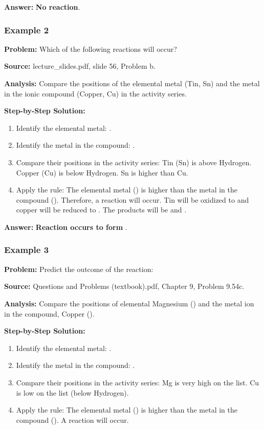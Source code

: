 \documentclass{article}
\begin{document}
\textbf{Answer:} \textbf{No reaction}.

\subsubsection{Example 2}
\textbf{Problem:} Which of the following reactions will occur? 

\textbf{Source:} lecture\_slides.pdf, slide 56, Problem b.

\textbf{Analysis:} Compare the positions of the elemental metal (Tin, Sn) and the metal in the ionic compound (Copper, Cu) in the activity series.

\textbf{Step-by-Step Solution:}
\begin{enumerate}
    \item Identify the elemental metal: .
    \item Identify the metal in the compound: .
    \item Compare their positions in the activity series: Tin (Sn) is above Hydrogen. Copper (Cu) is below Hydrogen. Sn is higher than Cu.
    \item Apply the rule: The elemental metal () is higher than the metal in the compound (). Therefore, a reaction will occur. Tin will be oxidized to  and copper will be reduced to . The products will be  and .
\end{enumerate}

\textbf{Answer:} \textbf{Reaction occurs to form }.

\subsubsection{Example 3}
\textbf{Problem:} Predict the outcome of the reaction: 

\textbf{Source:} Questions and Problems (textbook).pdf, Chapter 9, Problem 9.54c.

\textbf{Analysis:} Compare the positions of elemental Magnesium () and the metal ion in the compound, Copper ().

\textbf{Step-by-Step Solution:}
\begin{enumerate}
    \item Identify the elemental metal: .
    \item Identify the metal in the compound: .
    \item Compare their positions in the activity series: Mg is very high on the list. Cu is low on the list (below Hydrogen).
    \item Apply the rule: The elemental metal () is higher than the metal in the compound (). A reaction will occur.
\end{enumerate}
\end{document}

